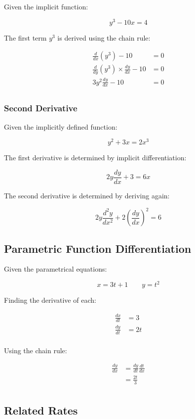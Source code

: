 \documentclass[a4paper,11pt]{report}
\begin{document}
Given the implicit function:

$$
y^3 - 10x = 4
$$

The first term $y^3$ is derived using the chain rule:

$$
\begin{aligned}
\frac{d}{dx} (y^3) - 10 & = 0 \\
\frac{d}{dy} (y^3) \times \frac{dy}{dx} - 10 & = 0 \\
3y^2 \frac{dy}{dx} - 10 & = 0 \\
\end{aligned}
$$

\subsubsection{Second Derivative}

Given the implicitly defined function:

$$
y^2 + 3x = 2x^3
$$

The first derivative is determined by implicit differentiation:

$$
2y \frac{dy}{dx} + 3 = 6x
$$

The second derivative is determined by deriving again:

$$
2y \frac{d^2y}{dx^2} + 2 (\frac{dy}{dx})^2 = 6
$$

\subsection{Parametric Function Differentiation}

Given the parametrical equations:

$$
x = 3t + 1 \qquad y = t^2
$$

Finding the derivative of each:

$$
\begin{aligned}
\frac{dx}{dt} & = 3 \\
\frac{dy}{dt} & = 2t \\
\end{aligned}
$$

Using the chain rule:

$$
\begin{aligned}
\frac{dy}{dx} & = \frac{dy}{dt} \frac{dt}{dx} \\
& = \frac{2t}{3} \\
\end{aligned}
$$

\subsection{Related Rates}
\end{document}
